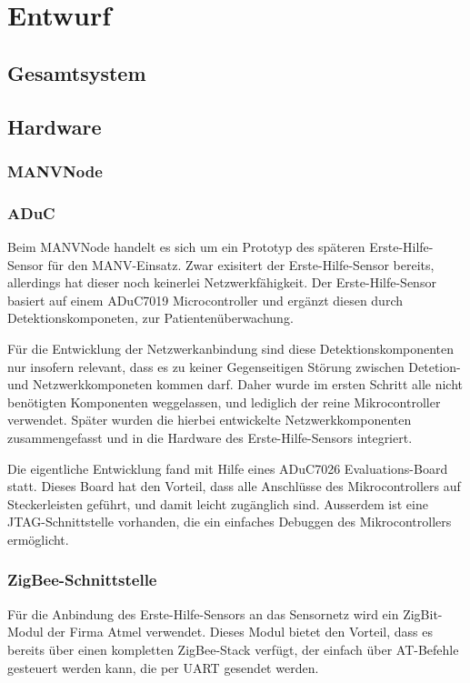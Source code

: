 

\chapter{Entwurf}

\section{Gesamtsystem}

\section{Hardware}
\subsection{MANVNode}

\subsection{ADuC}
Beim MANVNode handelt es sich um ein Prototyp des späteren Erste-Hilfe-Sensor für den MANV-Einsatz. Zwar exisitert der 
Erste-Hilfe-Sensor bereits, allerdings hat dieser noch keinerlei Netzwerkfähigkeit. Der Erste-Hilfe-Sensor basiert
auf einem ADuC7019 Microcontroller und ergänzt diesen durch Detektionskomponeten, zur Patientenüberwachung.

Für die Entwicklung der Netzwerkanbindung sind diese Detektionskomponenten nur insofern relevant, dass es zu keiner
Gegenseitigen Störung zwischen Detetion- und Netzwerkkomponeten kommen darf. Daher wurde im ersten Schritt alle nicht
benötigten Komponenten weggelassen, und lediglich der reine Mikrocontroller verwendet. Später wurden die hierbei
entwickelte Netzwerkkomponenten zusammengefasst und in die Hardware des Erste-Hilfe-Sensors integriert.

Die eigentliche Entwicklung fand mit Hilfe eines ADuC7026 Evaluations-Board statt. Dieses Board hat den Vorteil, 
dass alle Anschlüsse des Mikrocontrollers auf Steckerleisten geführt, und damit leicht zugänglich sind. Ausserdem
ist eine JTAG-Schnittstelle vorhanden, die ein einfaches Debuggen des Mikrocontrollers ermöglicht.

\subsection{ZigBee-Schnittstelle}
Für die Anbindung des Erste-Hilfe-Sensors an das Sensornetz wird ein ZigBit-Modul der Firma Atmel verwendet. 
Dieses Modul bietet den Vorteil, dass es bereits über einen kompletten ZigBee-Stack verfügt, der einfach über
AT-Befehle gesteuert werden kann, die per UART gesendet werden.

